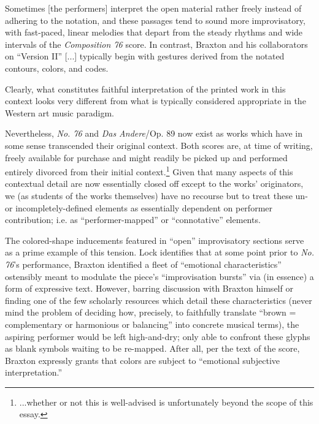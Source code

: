             \begin{smallquote}
                Sometimes [the performers] interpret the open material rather freely instead of adhering to the notation, and these passages tend to sound more improvisatory, with fast-paced, linear melodies that depart from the steady rhythms and wide intervals of the \textit{Composition 76} score. In contrast, Braxton and his collaborators on ``Version II'' [...] typically begin with gestures derived from the notated contours, colors, and codes.\autocite[266]{Steinbeck_2018}
            \end{smallquote}

        \noindent Clearly, what constitutes faithful interpretation of the printed work in this context looks very different from what is typically considered appropriate in the Western art music paradigm. 
    
        Nevertheless, \textit{No. 76} and \textit{Das Andere}/Op. 89 now exist as works which have in some sense transcended their original context. Both scores are, at time of writing, freely available for purchase and might readily be picked up and performed entirely divorced from their initial context.\footnote{...whether or not this is well-advised is unfortunately beyond the scope of this essay.} Given that many aspects of this contextual detail are now essentially closed off except to the works' originators, we (as students of the works themselves) have no recourse but to treat these un- or incompletely-defined elements as essentially dependent on performer contribution; i.e. as ``performer-mapped'' or ``connotative'' elements.

        The colored-shape inducements featured in ``open'' improvisatory sections serve as a prime example of this tension. Lock identifies that at some point prior to \textit{No. 76}'s performance, Braxton identified a fleet of ``emotional characteristics'' ostensibly meant to modulate the piece's ``improvisation bursts'' via (in essence) a form of expressive text. However, barring discussion with Braxton himself or finding one of the few scholarly resources which detail these characteristics (never mind the problem of deciding how, precisely, to faithfully translate ``brown = complementary or harmonious or balancing'' into concrete musical terms), the aspiring performer would be left high-and-dry; only able to confront these glyphs as blank symbols waiting to be re-mapped. After all, per the text of the score, Braxton expressly grants that colors are subject to ``emotional subjective interpretation.''
    
